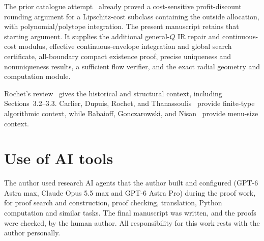 \documentclass[11pt,a4paper]{article}
\numberwithin{equation}{section}
\begin{document}
The prior catalogue attempt~\cite{PriorAttempt}
already proved a cost-sensitive profit-discount
rounding argument for a Lipschitz-cost subclass containing the outside
allocation, with polynomial/polytope integration.
The present manuscript retains that starting
argument. It supplies the additional general-\(Q\) IR repair and
continuous-cost modulus, effective continuous-envelope integration and
global search certificate, all-boundary compact existence proof,
precise uniqueness and nonuniqueness results, a sufficient flow
verifier, and the exact radial geometry and computation module.

Rochet's review~\cite{Rochet2024} gives the historical and structural
context, including Sections~3.2--3.3.
Carlier, Dupuis, Rochet, and Thanassoulis~\cite{CDRT2024} provide
finite-type algorithmic context, while
Babaioff, Gonczarowski, and Nisan~\cite{BGN} provide menu-size context.

\section*{Use of AI tools}
The author used research AI agents that the author built and configured (GPT-6 Astra max,
Claude Opus 5.5 max and GPT-6 Astra Pro) during the proof work, for proof search and
construction, proof checking, translation, Python computation and similar tasks. The final
manuscript was written, and the proofs were checked, by the human author. All responsibility
for this work rests with the author personally.
\end{document}
